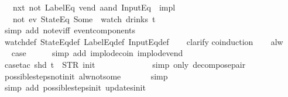 \begin{isabellebody}
\ \ \ {\isacharparenleft}nxt\ {\isacharparenleft}not\ {\isacharparenleft}LabelEq\ {\isacharprime}{\isacharprime}vend{\isacharprime}{\isacharprime}\ aand\ InputEq\ {\isacharbrackleft}{\isacharbrackright}{\isacharparenright}{\isacharparenright}{\isacharparenright}{\isacharparenright}\ impl\isanewline
\ \ \ {\isacharparenleft}not\ {\isacharparenleft}ev\ {\isacharparenleft}StateEq\ {\isacharparenleft}Some\ {}{\isacharparenright}{\isacharparenright}{\isacharparenright}{\isacharparenright}{\isacharparenright}\ {\isacharparenleft}watch\ drinks\ t{\isacharparenright}{\isachardoublequoteclose}\isanewline
%
\isadelimproof
\ \ %
\endisadelimproof
%
\isatagproof
{}\isamarkupfalse%
\ {\isacharparenleft}simp\ add{\isacharcolon}\ not{\isacharunderscore}ev{\isacharunderscore}iff\ event{\isacharunderscore}components{\isacharparenright}\isanewline
\ \ \isamarkupfalse%
\ watch{\isacharunderscore}def\ StateEq{\isacharunderscore}def\ LabelEq{\isacharunderscore}def\ InputEq{\isacharunderscore}def\isanewline
\ \ \isamarkupfalse%
\ clarify\isanewline
{}\isamarkupfalse%
{\isacharparenleft}coinduction{\isacharparenright}\isanewline
\ \ \isamarkupfalse%
\ alw\isanewline
\ \ \isamarkupfalse%
\ \isamarkupfalse%
\ {\isacharquery}case\isanewline
\ \ \ \ \isamarkupfalse%
\ {\isacharparenleft}simp\ add{\isacharcolon}\ implode{\isacharunderscore}coin\ implode{\isacharunderscore}vend{\isacharparenright}\isanewline
\ \ \ \ \isamarkupfalse%
\ {\isacharparenleft}case{\isacharunderscore}tac\ {\isachardoublequoteopen}shd\ t\ {\isacharequal}\ {\isacharparenleft}STR\ {\isacharprime}{\isacharprime}init{\isacharprime}{\isacharprime}{\isacharcomma}\ {\isacharbrackleft}{\isacharbrackright}{\isacharparenright}{\isachardoublequoteclose}{\isacharparenright}\isanewline
\ \ \ \ \ \isamarkupfalse%
\isanewline
\ \ \ \ \ \isamarkupfalse%
\ {\isacharparenleft}simp\ only{\isacharcolon}\ decompose{\isacharunderscore}pair{\isacharparenright}\isanewline
\ \ \ \ \isamarkupfalse%
\ possible{\isacharunderscore}steps{\isacharunderscore}not{\isacharunderscore}init\ alw{\isacharunderscore}not{\isacharunderscore}some\isanewline
\ \ \ \ \ \isamarkupfalse%
\ simp\isanewline
\ \ \ \ \isamarkupfalse%
\ {\isacharparenleft}simp\ add{\isacharcolon}\ possible{\isacharunderscore}steps{\isacharunderscore}init\ updates{\isacharunderscore}init{\isacharparenright}\isanewline

\end{isabellebody}
